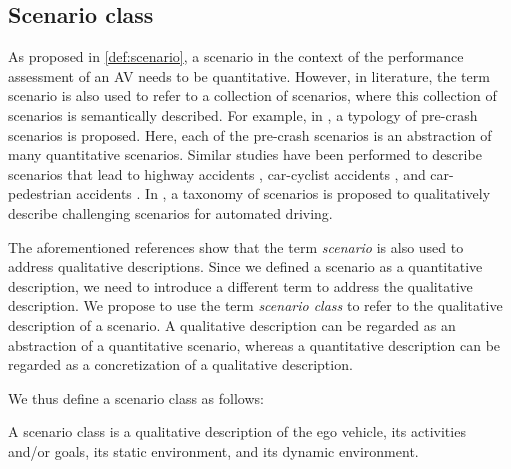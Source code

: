 \subsection{Scenario class}
\label{sec:scenario class}

\cbstart
As proposed in \cref{def:scenario}, a scenario in the context of the performance assessment of an AV needs to be quantitative. 
However, in literature, the term scenario is also used to refer to a collection of scenarios, where this collection of scenarios is semantically described. For example, in \cite{USDoT2007precrashscenarios}, a typology of pre-crash scenarios is proposed. Here, each of the pre-crash scenarios is an abstraction of many quantitative scenarios. Similar studies have been performed to describe scenarios that lead to highway accidents \cite{adaptive2017d73}, car-cyclist accidents \cite{opdencamp2014cats}, and car-pedestrian accidents \cite{lenard2011typical}. In \cite{catapult2017taxonomy}, a taxonomy of scenarios is proposed to qualitatively describe challenging scenarios for automated driving.

The aforementioned references \cite{USDoT2007precrashscenarios, adaptive2017d73, opdencamp2014cats, lenard2011typical, catapult2017taxonomy} show that the term \emph{scenario} is also used to address qualitative descriptions. Since we defined a scenario as a quantitative description, we need to introduce a different term to address the qualitative description. We propose to use the term \emph{scenario class} to refer to the qualitative description of a scenario. A qualitative description can be regarded as an abstraction of a quantitative scenario, \cbstartb whereas a quantitative description can be regarded as a concretization of a qualitative description.
\cbend

We thus define a scenario class as follows:
\begin{definition} \label{def:scenario class}
	A scenario class is a qualitative description of the ego vehicle, its activities and/or goals, its static environment, and its dynamic environment.
\end{definition}

